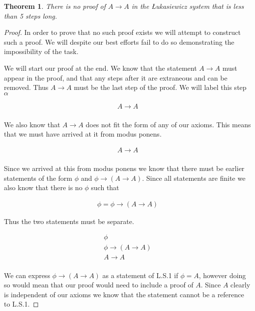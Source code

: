 \documentclass{article}
\newtheorem{thm}{Theorem}
\begin{document}
\begin{thm}
There is no proof of $A \rightarrow A$ in the \L ukasiewicz system that is less than 5 steps long.
\end{thm}
\begin{proof}
In order to prove that no such proof exists we will attempt to construct such a proof.
We will despite our best efforts fail to do so demonstrating the impossibility of the task.

We will start our proof at the end.
We know that the statement $A \rightarrow A$ must appear in the proof,
and that any steps after it are extraneous and can be removed.
Thus $A \rightarrow A$ must be the last step of the proof.
We will label this step $\alpha$

\begin{align*}
A \rightarrow A \tag*{($\alpha$)}\\
\end{align*}

We also know that $A \rightarrow A$ does not fit the form of any of our axioms.
This means that we must have arrived at it from modus ponens.

\begin{align*}
A \rightarrow A \tag*{Modus Ponens ($\alpha$)}\\
\end{align*}

Since we arrived at this from modus ponens we know that there must be earlier statements of the form $\phi$ and $\phi \rightarrow (A \rightarrow A)$.
Since all statements are finite we also know that there is no $\phi$ such that

\begin{align*}
\phi = \phi \rightarrow (A \rightarrow A)
\end{align*}

Thus the two statements must be separate.

\begin{gather*}
\phi \tag{$\gamma$}\\
\phi \rightarrow (A \rightarrow A) \tag{$\beta$}\\
A \rightarrow A \tag*{Modus Ponens ($\alpha$)}\\
\end{gather*}

We can express $\phi \rightarrow (A \rightarrow A)$ as a statement of L.S.1 if $\phi = A$,
however doing so would mean that our proof would need to include a proof of $A$.
Since $A$ clearly is independent of our axioms we know that the statement cannot be a reference to L.S.1.


\end{proof}
\end{document}
